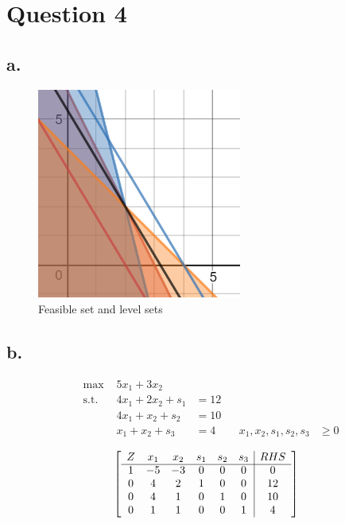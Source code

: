\documentclass[10pt, letterpaper]{paper}
\begin{document}
\section*{Question 4}
\subsection*{a.}
\begin{figure}[H]
\centering
\includegraphics[width=0.6\textwidth]{desmos-graph__4_.png}
\caption{ Feasible set and level sets }

\end{figure}
\subsection*{b.}
\begin{equation*}
\begin{alignedat}{3}
&\text{max }&5x_1 +3x_2&\\
&\text{s.t. } &4x_1 + 2x_2 + s_1 &= 12\\
& &4x_1 + x_2 + s_2  &= 10\\
& &x_1 + x_2 + s_3 &= 4
& &x_1, x_2, s_1, s_2, s_3 &\geq 0
\end{alignedat}
\end{equation*}

\[
	\left[ {\begin{array}{cccccc|c}
	Z & x_1 & x_2 & s_1 & s_2 & s_3 & RHS\\ \cline{1-7}
	1 & -5 & -3 & 0 & 0 & 0 & 0 \\
	0 & 4 & 2 & 1 & 0 & 0 & 12 \\
	0 & 4 & 1 & 0 & 1 & 0 & 10 \\
	0 & 1 & 1 & 0 & 0 & 1 & 4 \\
	\end{array} } \right]
\]
\end{document}
